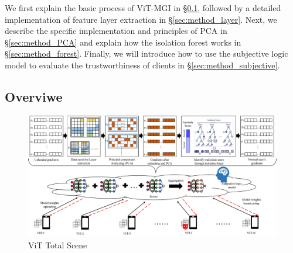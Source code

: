 \documentclass[conference]{IEEEtran}
\def\figTotalScene{\textwidth}
\begin{document}
We first explain the basic process of ViT-MGI in \hyperref[sec:method_basic]{§\ref{sec:method_basic}}, followed by a detailed implementation of feature layer extraction in \hyperref[sec:method_layer]{§\ref{sec:method_layer}}. Next, we describe the specific implementation and principles of PCA in \hyperref[sec:method_PCA]{§\ref{sec:method_PCA}} and explain how the isolation forest works in \hyperref[sec:method_forest]{§\ref{sec:method_forest}}. Finally, we will introduce how to use the subjective logic model to evaluate the trustworthiness of clients in \hyperref[sec:method_subjective]{§\ref{sec:method_subjective}}.

\subsection{Overviwe}
\label{sec:method_basic}

\begin{figure}[htbp]
    \centerline{\includegraphics[width=\figTotalScene]{pics/000-totalScene.pdf}}
    \vspace{-10px}  %
    \caption{ViT Total Scene}
    \label{fig:totalScene}
    \vspace{-20px}
\end{figure}


\end{document}
